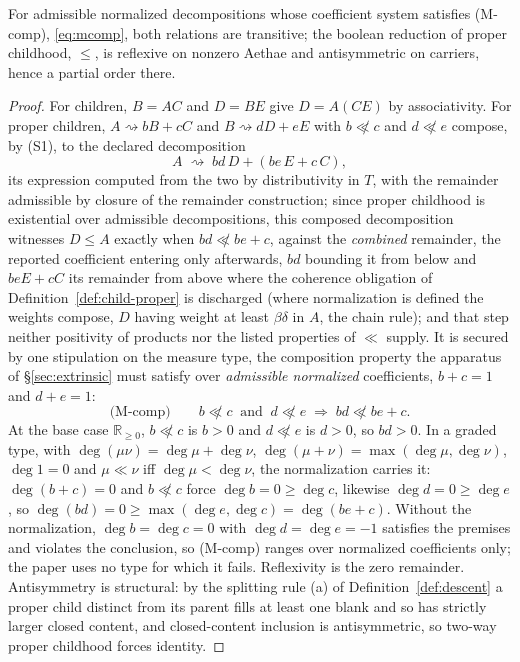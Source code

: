 \begin{prop}\label{prop:child-transitive} For admissible normalized decompositions whose coefficient system satisfies (M-comp), \eqref{eq:mcomp}, both relations are transitive; the boolean reduction of proper childhood, $\le$, is reflexive on nonzero Aethae and antisymmetric on carriers, hence a partial order there. \end{prop}
\begin{proof} For children, $B = AC$ and $D = BE$ give $D = A(CE)$ by associativity. For proper children, $A \rightsquigarrow bB + cC$ and $B \rightsquigarrow dD + eE$ with $b \not\ll c$ and $d \not\ll e$ compose, by (S1), to the declared decomposition \[ A \;\rightsquigarrow\; bd\,D + (be\,E + c\,C), \] its expression computed from the two by distributivity in $T$, with the remainder admissible by closure of the remainder construction; since proper childhood is existential over admissible decompositions, this composed decomposition witnesses $D \le A$ exactly when $bd \not\ll be + c$, against the \emph{combined} remainder, the reported coefficient entering only afterwards, $bd$ bounding it from below and $beE + cC$ its remainder from above where the coherence obligation of Definition~\ref{def:child-proper} is discharged (where normalization is defined the weights compose, $D$ having weight at least $\beta\delta$ in $A$, the chain rule); and that step neither positivity of products nor the listed properties of $\ll$ supply. It is secured by one stipulation on the measure type, the composition property the apparatus of \S\ref{sec:extrinsic} must satisfy over \emph{admissible normalized} coefficients, $b + c = 1$ and $d + e = 1$: \begin{equation}\label{eq:mcomp} \text{(M-comp)}\qquad b \not\ll c \ \text{ and } \ d \not\ll e \;\Longrightarrow\; bd \not\ll be + c . \end{equation} At the base case $\mathbb{R}_{\ge 0}$, $b \not\ll c$ is $b > 0$ and $d \not\ll e$ is $d > 0$, so $bd > 0$. In a graded type, with $\deg(\mu\nu) = \deg\mu + \deg\nu$, $\deg(\mu + \nu) = \max(\deg\mu, \deg\nu)$, $\deg 1 = 0$ and $\mu \ll \nu$ iff $\deg\mu < \deg\nu$, the normalization carries it: $\deg(b + c) = 0$ and $b \not\ll c$ force $\deg b = 0 \ge \deg c$, likewise $\deg d = 0 \ge \deg e$, so $\deg(bd) = 0 \ge \max(\deg e, \deg c) = \deg(be + c)$. Without the normalization, $\deg b = \deg c = 0$ with $\deg d = \deg e = -1$ satisfies the premises and violates the conclusion, so (M-comp) ranges over normalized coefficients only; the paper uses no type for which it fails. Reflexivity is the zero remainder. Antisymmetry is structural: by the splitting rule (a) of Definition~\ref{def:descent} a proper child distinct from its parent fills at least one blank and so has strictly larger closed content, and closed-content inclusion is antisymmetric, so two-way proper childhood forces identity. \end{proof}

